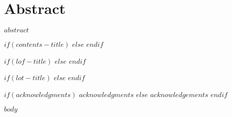 \documentclass[12pt,oneside,letterpaper]{memoir}
\makeatletter
\newcommand{\wb@episource}{}
\newenvironment{wbepi}[1]{\begin{quote}\renewcommand{\wb@episource}{#1}\itshape}{\par\upshape \raggedleft --- \textsc{\wb@episource}\\ \end{quote}}
\makeatother
\begin{document}
\cleardoublepage
\chapter*{Abstract}
$abstract$




\setpnumwidth{2em}

%

$if(contents-title)$
  \renewcommand{\contentsname}{$contents-title$}
$else$
  \renewcommand{\contentsname}{Contents}
$endif$

$if(lof-title)$
  \renewcommand{\listfigurename}{$lof-title$}
$else$
  \renewcommand{\listfigurename}{List of Figures}
$endif$

$if(lot-title)$
  \renewcommand{\listtablename}{$lot-title$}
$else$
  \renewcommand{\listtablename}{List of Tables}
$endif$

\tableofcontents

\clearpage
\listoftables

\clearpage
\listoffigures

\clearpage


\begin{acks}

%
%

$if(acknowledgments)$
  $acknowledgments$
$else$
  $acknowledgements$
$endif$

\end{acks}


\clearpage{}

$body$

\end{document}
